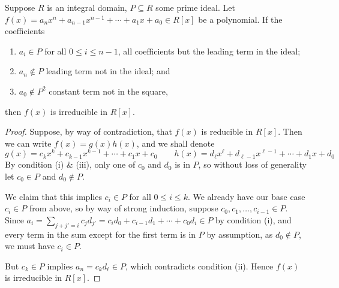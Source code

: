 \begin{theorem}\label{thm:eisenstein-criterion}
    Suppose \(R\) is an integral domain, \(P \subseteq R\) some prime ideal.
    Let \(f(x) = a_n x^n + a_{n-1}x^{n-1} + \cdots + a_1 x + a_0 \in R[x]\)
    be a polynomial.
    If the coefficients
    \begin{enumerate}[label={(\roman*)}, itemsep=0mm]
        \item \(a_i \in P\) for all \(0 \leq i \leq n-1\),
            all coefficients but the leading term in the ideal;
        \item \(a_n \notin P\) leading term not in the ideal; and
        \item \(a_0 \notin P^2\) constant term not in the square,
    \end{enumerate}
    then \(f(x)\) is irreducible in \(R[x]\).
\end{theorem}
\begin{proof}
    Suppose, by way of contradiction, that \(f(x)\) is reducible in \(R[x]\).
    Then we can write \(f(x) = g(x)h(x)\), and we shall denote
    \begin{equation*}
        g(x) = c_k x^k + c_{k-1}x^{k-1} + \cdots + c_1 x + c_0 \qquad
        h(x) = d_\ell x^\ell + d_{\ell-1}x^{\ell-1} + \cdots + d_1 x + d_0
    \end{equation*}
    By condition (i) \& (iii),
    only one of \(c_0\) and \(d_0\) is in \(P\),
    so without loss of generality let \(c_0 \in P\) and \(d_0 \notin P\).

    We claim that this implies \(c_i \in P\) for all \(0 \leq i \leq k\).
    We already have our base case \(c_i \in P\) from above,
    so by way of strong induction,
    suppose \(c_0,c_1,\hdots,c_{i-1} \in P\).
    Since \(a_i = \sum_{j+j'=i} c_j d_{j'} = c_i d_0 + c_{i-1}d_1 + \cdots + c_0 d_i \in P\)
    by condition (i),
    and every term in the sum except for the first term is in \(P\) by assumption,
    as \(d_0 \notin P\), we must have \(c_i \in P\).

    But \(c_k \in P\) implies \(a_n = c_k d_\ell \in P\),
    which contradicts condition (ii).
    Hence \(f(x)\) is irreducible in \(R[x]\).
\end{proof}

